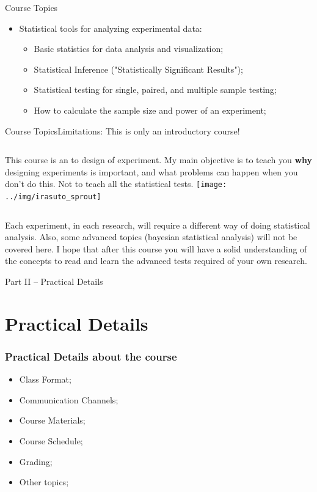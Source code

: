 \documentclass[aspectratio=169]{beamer}
\begin{document}
\begin{CJK}{UTF8}{ipxm}
\begin{frame}{Course Topics}
\begin{itemize}
    \item Statistical tools for analyzing experimental data:
    \begin{itemize}
      \item Basic statistics for data analysis and visualization;
      \item Statistical Inference ("Statistically Significant Results");
      \item Statistical testing for single, paired, and multiple sample testing;
      \item How to calculate the sample size and power of an experiment;
    \end{itemize}
  \end{itemize}
\end{frame}

\begin{frame}{Course Topics}{Limitations: This is only an introductory course!}

  \begin{columns}
    This course is an  to design of experiment. My main objective is to teach you {\bf why} designing experiments is important, and what problems can happen when you don't do this. Not to teach all the statistical tests.
      \texttt{[image: ../img/irasuto\_sprout]}
  \end{columns}
  \vfill

  Each experiment, in each research, will require a different way of doing statistical analysis. Also, some advanced topics (bayesian statistical analysis) will not be covered here. I hope that after this course you will have a solid understanding of the concepts to read and learn the advanced tests required of your own research.
\end{frame}

\begin{frame}
  \begin{center}
    Part II -- Practical Details
  \end{center}
\end{frame}

\section{Practical Details}
\begin{frame}
  \frametitle{Practical Details about the course}
  \begin{itemize}
    \item Class Format;
    \item Communication Channels;
    \item Course Materials;
    \item Course Schedule;
    \item Grading;
    \item Other topics;
  \end{itemize}\vfill


\end{frame}
\end{CJK}
\end{document}
